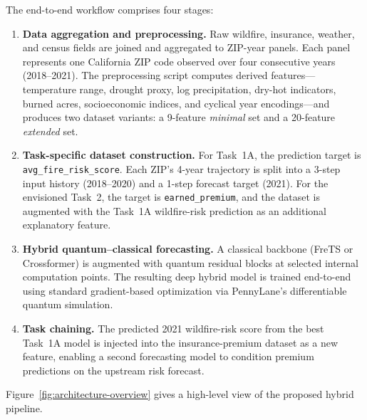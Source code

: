 \documentclass[11pt]{article}
\begin{document}
The end-to-end workflow comprises four stages:
\begin{enumerate}
  \item \textbf{Data aggregation and preprocessing.} Raw wildfire, insurance, weather, and census fields are joined and aggregated to ZIP-year panels. Each panel represents one California ZIP code observed over four consecutive years (2018--2021). The preprocessing script computes derived features---temperature range, drought proxy, log precipitation, dry-hot indicators, burned acres, socioeconomic indices, and cyclical year encodings---and produces two dataset variants: a 9-feature \emph{minimal} set and a 20-feature \emph{extended} set.
  \item \textbf{Task-specific dataset construction.} For Task~1A, the prediction target is \texttt{avg\_fire\_risk\_score}. Each ZIP's 4-year trajectory is split into a 3-step input history (2018--2020) and a 1-step forecast target (2021). For the envisioned Task~2, the target is \texttt{earned\_premium}, and the dataset is augmented with the Task~1A wildfire-risk prediction as an additional explanatory feature.
  \item \textbf{Hybrid quantum--classical forecasting.} A classical backbone (FreTS or Crossformer) is augmented with quantum residual blocks at selected internal computation points. The resulting deep hybrid model is trained end-to-end using standard gradient-based optimization via PennyLane's differentiable quantum simulation.
  \item \textbf{Task chaining.} The predicted 2021 wildfire-risk score from the best Task~1A model is injected into the insurance-premium dataset as a new feature, enabling a second forecasting model to condition premium predictions on the upstream risk forecast.
\end{enumerate}

Figure~\ref{fig:architecture-overview} gives a high-level view of the proposed hybrid pipeline.
\end{document}
